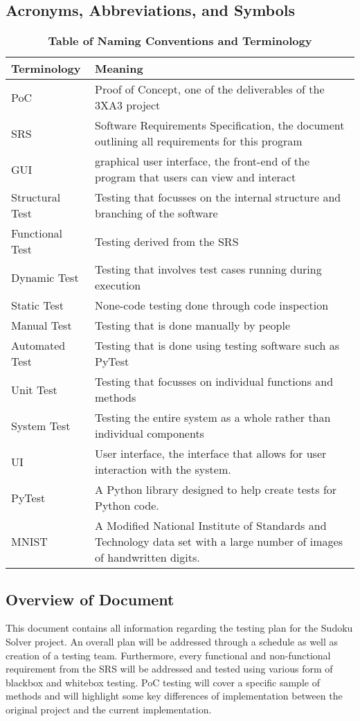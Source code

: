 \documentclass[11pt]{article}
\begin{document}
\subsection{Acronyms, Abbreviations, and Symbols}
\begin{table}[H]
\caption{\bf Table of Naming Conventions and Terminology} \label{Table}
\centering
\begin{tabularx}{\textwidth}{p{3cm}X}
\toprule
Terminology     & Meaning \\
\midrule
PoC & Proof of Concept, one of the deliverables of the 3XA3 project\\
SRS & Software Requirements Specification, the document outlining all requirements for this program\\
GUI & graphical user interface, the front-end of the program that users can view and interact\\
Structural Test & Testing that focusses on the internal structure and branching of the software\\
Functional Test & Testing derived from the SRS\\
Dynamic Test & Testing that involves test cases running during execution\\
Static Test & None-code testing done through code inspection\\
Manual Test & Testing that is done manually by people\\
Automated Test & Testing that is done using testing software such as PyTest\\
Unit Test & Testing that focusses on individual functions and methods\\
System Test & Testing the entire system as a whole rather than individual components\\
UI     & User interface, the interface that allows for user interaction with the system. \\
PyTest & A Python library designed to help create tests for Python code. \\
MNIST & A Modified National Institute of Standards and Technology data set with a large number of images of handwritten digits.\\
\bottomrule
\end{tabularx}
\end{table}

\subsection{Overview of Document}
This document contains all information regarding the testing plan for the Sudoku Solver project. An overall plan will be addressed through a schedule as well as creation of a testing team. Furthermore, every functional and non-functional requirement from the SRS will be addressed and tested using various form of blackbox and whitebox testing. PoC testing will cover a specific sample of methods and will highlight some key differences of implementation between the original project and the current implementation.
\end{document}
